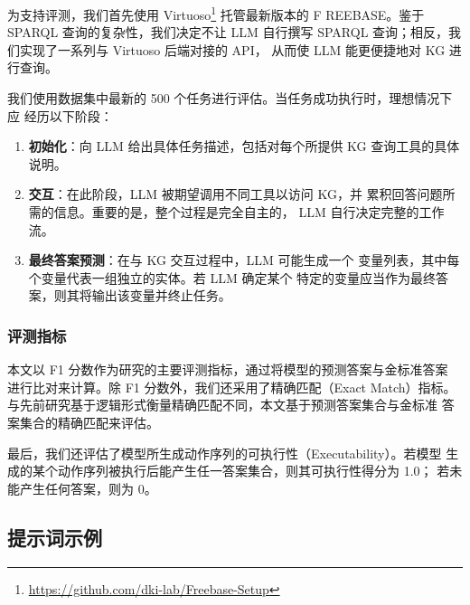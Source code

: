 为支持评测，我们首先使用 Virtuoso\footnote{\url{https://github.com/dki-lab/Freebase-Setup}}
托管最新版本的 F REEBASE。鉴于 SPARQL 查询的复杂性，我们决定不让 LLM
自行撰写 SPARQL 查询；相反，我们实现了一系列与 Virtuoso 后端对接的 API，
从而使 LLM 能更便捷地对 KG 进行查询。

我们使用数据集中最新的 500 个任务进行评估。当任务成功执行时，理想情况下应
经历以下阶段：
\begin{enumerate}
    \item \textbf{初始化}：向 LLM 给出具体任务描述，包括对每个所提供
          KG 查询工具的具体说明。
    \item \textbf{交互}：在此阶段，LLM 被期望调用不同工具以访问 KG，并
          累积回答问题所需的信息。重要的是，整个过程是完全自主的，
          LLM 自行决定完整的工作流。
    \item \textbf{最终答案预测}：在与 KG 交互过程中，LLM 可能生成一个
          变量列表，其中每个变量代表一组独立的实体。若 LLM 确定某个
          特定的变量应当作为最终答案，则其将输出该变量并终止任务。
\end{enumerate}

\subsubsection*{评测指标}

本文以 F1 分数作为研究的主要评测指标，通过将模型的预测答案与金标准答案
进行比对来计算。除 F1 分数外，我们还采用了精确匹配（Exact Match）指标。
与先前研究基于逻辑形式衡量精确匹配不同，本文基于预测答案集合与金标准
答案集合的精确匹配来评估。

最后，我们还评估了模型所生成动作序列的可执行性（Executability）。若模型
生成的某个动作序列被执行后能产生任一答案集合，则其可执行性得分为 1.0；
若未能产生任何答案，则为 0。

\subsection{提示词示例}

